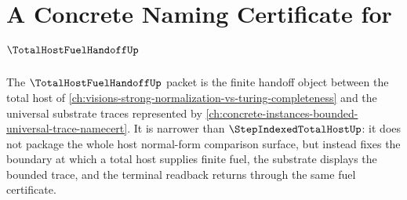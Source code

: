 \chapter{A Concrete Naming Certificate for $\TotalHostFuelHandoffUp$}
\label{ch:concrete-instances-totalhostfuelhandoff-namecert}

The $\TotalHostFuelHandoffUp$ packet is the finite handoff object between the total host of \autoref{ch:visions-strong-normalization-vs-turing-completeness} and the universal substrate traces represented by \autoref{ch:concrete-instances-bounded-universal-trace-namecert}. It is narrower than $\StepIndexedTotalHostUp$: it does not package the whole host normal-form comparison surface, but instead fixes the boundary at which a total host supplies finite fuel, the substrate displays the bounded trace, and the terminal readback returns through the same fuel certificate.



